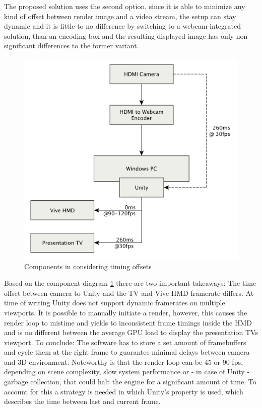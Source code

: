 The proposed solution uses the second option, since it is able to minimize any 
kind of offset between render image and a video stream, the setup can stay 
dynamic and it is little to no difference by switching to a webcam-integrated 
solution, than an encoding box and the resulting displayed image has only 
non-significant differences to the former variant.

\begin{figure}[htb]
	\includegraphics[width=\textwidth]{gfx/FPS-Timing-Components.png}
	\caption{Components in considering timing offsets}
	\label{fig:offsets:components}
\end{figure}

Based on the component diagram \ref{fig:offsets:components} there are two 
important takeaways: The time offset between camera to Unity and the TV and 
Vive HMD framerate differs. At time of writing Unity does not support dynamic 
framerates on multiple viewports. It is possible to manually initiate a render, 
however, this causes the render loop to mistime and yields to inconsistent 
frame timings inside the HMD and is no different between the average GPU load 
to display the presentation TVs viewport.
\newline
To conclude: The software has to store a set amount of \gls{framebuffer}s and 
cycle them at the right frame to guarantee minimal delays between camera and 3D 
environment.
\newline
Noteworthy is that the render loop can be 45 or 90 fps, depending on scene 
complexity, slow system performance or - in case of Unity - garbage collection, 
that could halt the engine for a significant amount of time. To account for 
this a strategy is needed in which Unity's  property is 
used, which describes the time between last and current frame.

